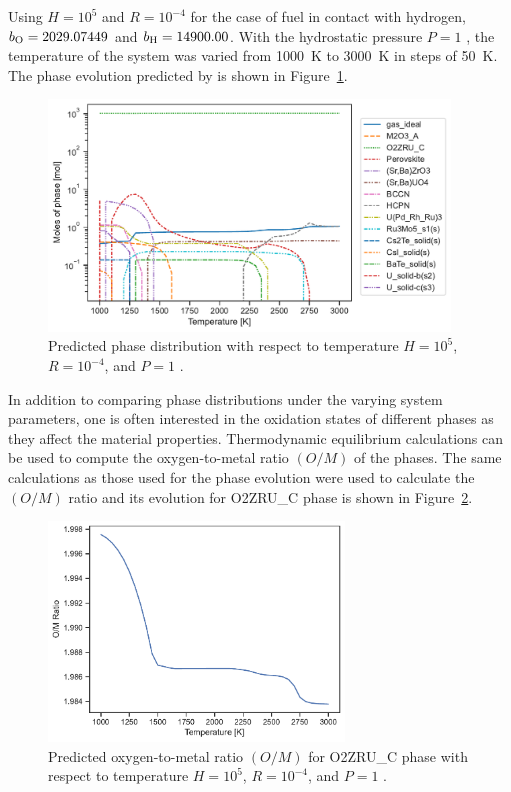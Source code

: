 Using $H = 10^5$ and $R = 10^{-4}$ for the case of fuel in contact with hydrogen, $b_{\ce{O}} = 2029.07449$ and $b_{\ce{H}} = 14900.00$. With the hydrostatic pressure $P = 1$ \si{\atmosphere}, the temperature of the system was varied from \SI{1000}{\kelvin} to \SI{3000}{\kelvin} in steps of \SI{50}{\kelvin}. The phase evolution predicted by {\GEM} is shown in Figure~\ref{fig:candu_phase}. 
\begin{figure}[ht]
         \centering
         \includegraphics[width=0.95\textwidth]{figures/chapter-7/Candu_moles.pdf}
         \caption{Predicted phase distribution with respect to temperature $H = 10^5$, $R = 10^{−4}$, and $P = 1$ \si{\atmosphere}.}
     \label{fig:candu_phase}
\end{figure}

In addition to comparing phase distributions under the varying system parameters, one is often interested in the oxidation states of different phases as they affect the material properties. Thermodynamic equilibrium calculations can be used to compute the oxygen-to-metal ratio $\left(O/M\right)$ of the phases. The same calculations as those used for the phase evolution were used to calculate the $\left(O/M\right)$ ratio and its evolution for O2ZRU\_C phase is shown in Figure~\ref{fig:candu_om}.
\begin{figure}[htb]
         \centering
         \includegraphics[width=0.7\textwidth]{figures/chapter-7/Candu_OM.pdf}
         \caption{Predicted oxygen-to-metal ratio $\left(O/M\right)$ for O2ZRU\_C phase with respect to temperature $H = 10^5$, $R = 10^{−4}$, and $P = 1$ \si{\atmosphere}.}
     \label{fig:candu_om}
\end{figure}

